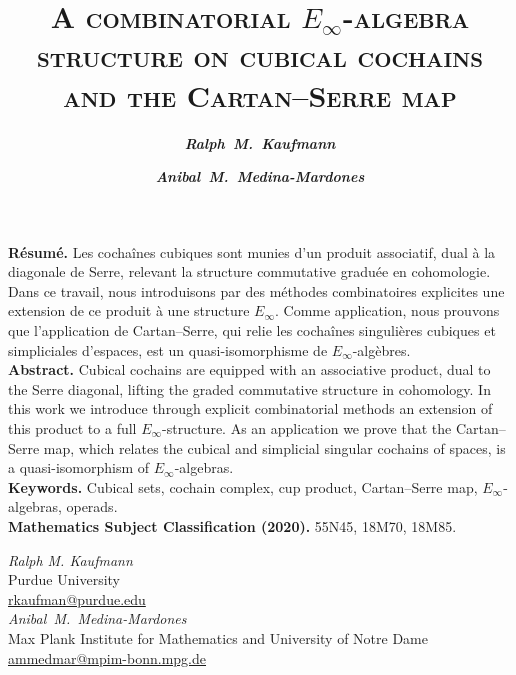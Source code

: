 \documentclass[12pt]{article}
\title{\vskip 5pt \bf \textsc{A combinatorial $E_\infty$-algebra structure on cubical cochains and the Cartan--Serre map}}
\author{
	\itshape\bfseries {Ralph~M.~Kaufmann} \and
	\itshape\bfseries {Anibal~M.~Medina-Mardones}
}
\begin{document}
	\maketitle
	\cfoot{}
	\thispagestyle{empty}
	\vskip 25pt
	\begin{adjustwidth}{0.5cm}{0.5cm}
		{\small
			{\bf R\'esum\'e.} Les cochaînes cubiques sont munies d'un produit associatif, dual à la diagonale de Serre, relevant la structure commutative graduée en cohomologie.
			Dans ce travail, nous introduisons par des méthodes combinatoires explicites une extension de ce produit à une structure $E_\infty$.
			Comme application, nous prouvons que l'application de Cartan--Serre, qui relie les cochaînes singulières cubiques et simpliciales d'espaces, est un quasi-isomorphisme de $E_\infty$-algèbres. \\
			{\bf Abstract.} Cubical cochains are equipped with an associative product, dual to the Serre diagonal, lifting the graded commutative structure in cohomology.
			In this work we introduce through explicit combinatorial methods an extension of this product to a full $E_\infty$-structure.
			As an application we prove that the Cartan--Serre map, which relates the cubical and simplicial singular cochains of spaces, is a quasi-isomorphism of $E_\infty$-algebras. \\
			{\bf Keywords.} Cubical sets, cochain complex, cup product, Cartan--Serre map, $E_\infty$-algebras, operads. \\
			{\bf Mathematics Subject Classification (2020).} 55N45, 18M70, 18M85.
		}
	\end{adjustwidth}

	
	
	
	
	
	
	
	\sloppy
	\printbibliography

	\noindent \textit{Ralph M. Kaufmann} \\
	Purdue University \\
	\href{mailto:rkaufman@purdue.edu}{rkaufman@purdue.edu} \\
	\newline
	\noindent \textit{Anibal~M.~Medina-Mardones} \\
	Max Plank Institute for Mathematics and University of Notre Dame \\
	\href{mailto:ammedmar@mpim-bonn.mpg.de}{ammedmar@mpim-bonn.mpg.de}
\end{document}
